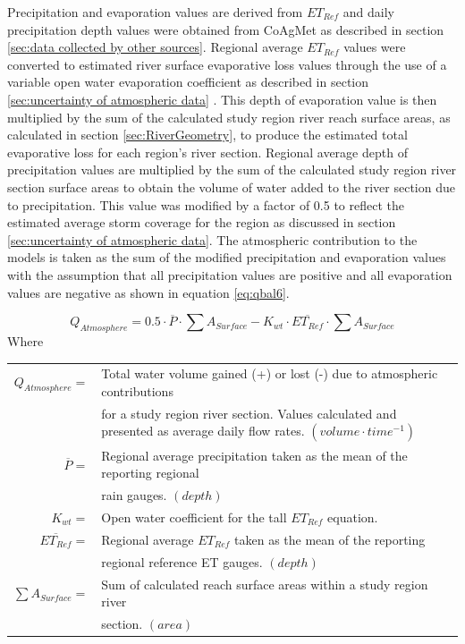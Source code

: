 \begin{linenumbers}
Precipitation and evaporation values are derived from $ET_{Ref}$ and daily precipitation depth values were obtained from CoAgMet as described in section \ref{sec:data collected by other sources}.  Regional average $ET_{Ref}$ values were converted to estimated river surface evaporative loss values through the use of a variable open water evaporation coefficient as described in section \ref{sec:uncertainty of atmospheric data} .  This depth of evaporation value is then multiplied by the sum of the calculated study region river reach surface areas, as calculated in section \ref{sec:RiverGeometry}, to produce the estimated total evaporative loss for each region's river section.  Regional average depth of precipitation values are multiplied by the sum of the calculated study region river section surface areas to obtain the volume of water added to the river section due to precipitation.  This value was modified by a factor of 0.5 to reflect the estimated average storm coverage for the region as discussed in section \ref{sec:uncertainty of atmospheric data}. The atmospheric contribution to the models is taken as the sum of the modified precipitation and evaporation values with the assumption that all precipitation values are positive and all evaporation values are negative as shown in equation \ref{eq:qbal6}.

\begin{equation}
	Q_{Atmosphere} = 0.5 \cdot \overline{P} \cdot \sum A_{Surface} - K_{wt} \cdot \overline{ET_{Ref}} \cdot \sum A_{Surface}
	\label{eq:qbal6}
\end{equation}
Where\\
\begin{tabular}{rl}
$Q_{Atmosphere} =$&Total water volume gained (+) or lost (-) due to atmospheric contributions \\
&for a study region river section. Values calculated and presented as average daily flow rates. $(volume \cdot time^{-1})$\\
$\overline{P} =$&Regional average precipitation taken as the mean of the reporting regional\\
&rain gauges. $(depth)$\\
$K_{wt} =$& Open water coefficient for the tall $ET_{Ref}$ equation.\\
$\overline{ET_{Ref}} =$&Regional average $ET_{Ref}$ taken as the mean of the reporting\\
&regional reference ET gauges.  $(depth)$\\
$\sum A_{Surface}=$&Sum of calculated reach surface areas within a study region river \\
&section.  $(area)$\\
\end{tabular}\\


\end{linenumbers}

